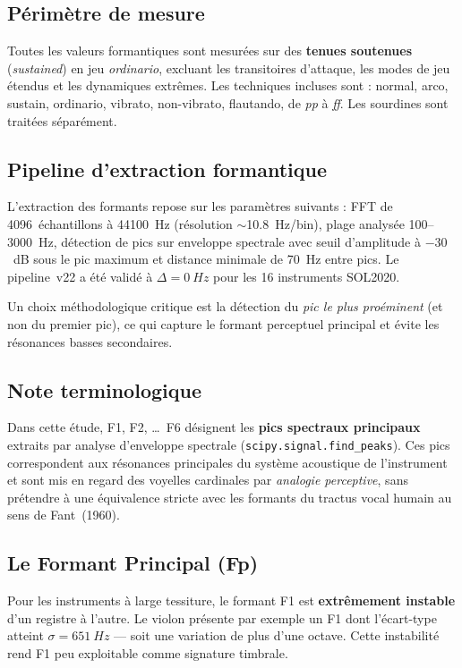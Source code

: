 \documentclass[11pt,a4paper]{article}
\begin{document}
\subsection{Périmètre de mesure}

Toutes les valeurs formantiques sont mesurées sur des \textbf{tenues
soutenues} (\emph{sustained}) en jeu \emph{ordinario}, excluant les
transitoires d'attaque, les modes de jeu étendus et les dynamiques
extrêmes. Les techniques incluses sont : normal, arco, sustain,
ordinario, vibrato, non-vibrato, flautando, de \emph{pp} à \emph{ff}.
Les sourdines sont traitées séparément.

\subsection{Pipeline d'extraction formantique}

L'extraction des formants repose sur les paramètres suivants : FFT de
\num{4096}~échantillons à \SI{44100}{Hz} (résolution
$\sim$\SI{10.8}{Hz/bin}), plage analysée 100--\SI{3000}{Hz}, détection
de pics sur enveloppe spectrale avec seuil d'amplitude à $-30$~dB sous
le pic maximum et distance minimale de \SI{70}{Hz} entre pics. Le
pipeline~v22 a été validé à $\Delta = \SI{0}{Hz}$ pour les 16
instruments SOL2020.

Un choix méthodologique critique est la détection du \emph{pic le plus
proéminent} (et non du premier pic), ce qui capture le formant perceptuel
principal et évite les résonances basses secondaires.

\subsection{Note terminologique}

Dans cette étude, F1, F2, \ldots\ F6 désignent les \textbf{pics
spectraux principaux} extraits par analyse d'enveloppe spectrale
(\texttt{scipy.signal.find\_peaks}). Ces pics correspondent aux
résonances principales du système acoustique de l'instrument et sont mis
en regard des voyelles cardinales par \emph{analogie perceptive}, sans
prétendre à une équivalence stricte avec les formants du tractus vocal
humain au sens de Fant~(1960).

\subsection{Le Formant Principal (Fp)}

Pour les instruments à large tessiture, le formant F1 est
\textbf{extrêmement instable} d'un registre à l'autre. Le violon
présente par exemple un F1 dont l'écart-type atteint $\sigma =
\SI{651}{Hz}$ --- soit une variation de plus d'une octave. Cette
instabilité rend F1 peu exploitable comme signature timbrale.
\end{document}
